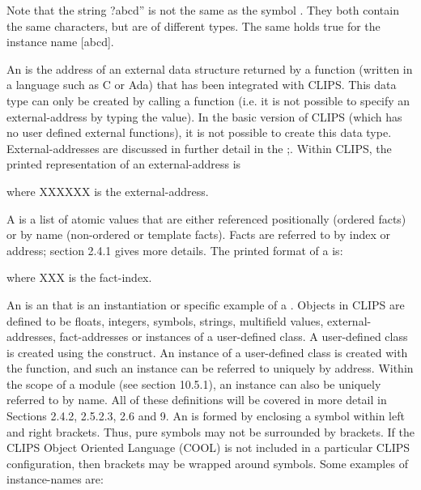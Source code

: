 \documentclass[letterpaper,10pt,english]{sphinxmanual}
\begin{document}
Note that the string ?abcd” is not the same as the symbol . They
both contain the same characters, but are of different types. The same
holds true for the instance name {[}abcd{]}.

An  is the address of an external data structure
returned by a function (written in a language such as C or Ada) that has
been integrated with CLIPS. This data type can only be created by
calling a function (i.e. it is not possible to specify an
external-address by typing the value). In the basic version of CLIPS
(which has no user defined external functions), it is not possible to
create this data type. External-addresses are discussed in further
detail in the ;. Within CLIPS, the printed
representation of an external-address is

\begin{sphinxVerbatim}[commandchars=\\\{\}]
\end{sphinxVerbatim}

where XXXXXX is the external-address.

A  is a list of atomic values that are either referenced
positionally (ordered facts) or by name (non-ordered or template facts).
Facts are referred to by index or address; section 2.4.1 gives more
details. The printed format of a  is:

\begin{sphinxVerbatim}[commandchars=\\\{\}]
\end{sphinxVerbatim}

where XXX is the fact-index.

An  is an  that is an instantiation or specific
example of a . Objects in CLIPS are defined to be floats,
integers, symbols, strings, multifield values, external-addresses,
fact-addresses or instances of a user-defined class. A user-defined
class is created using the  construct. An instance of a
user-defined class is created with the  function, and
such an instance can be referred to uniquely by address. Within the
scope of a module (see section 10.5.1), an instance can also be uniquely
referred to by name. All of these definitions will be covered in more
detail in Sections 2.4.2, 2.5.2.3, 2.6 and 9. An  is
formed by enclosing a symbol within left and right brackets. Thus, pure
symbols may not be surrounded by brackets. If the CLIPS Object Oriented
Language (COOL) is not included in a particular CLIPS configuration,
then brackets may be wrapped around symbols. Some examples of
instance-names are:
\end{document}
